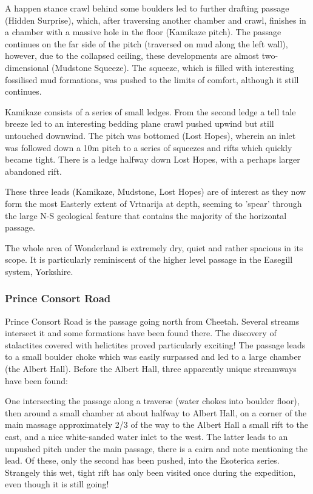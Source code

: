 \documentclass[english,a4]{article}
\begin{document}
A happen stance crawl behind some boulders led to further drafting
passage (Hidden Surprise), which, after traversing another chamber
and crawl, finishes in a chamber with a massive hole in the floor
(Kamikaze pitch). The passage continues on the far side of the pitch
(traversed on mud along the left wall), however, due to the collapsed
ceiling, these developments are almost two-dimensional (Mudstone Squeeze).
The squeeze, which is filled with interesting fossilised mud formations,
was pushed to the limits of comfort, although it still continues.

Kamikaze consists of a series of small ledges. From the second ledge
a tell tale breeze led to an interesting bedding plane crawl pushed
upwind but still untouched downwind. The pitch was bottomed (Lost
Hopes), wherein an inlet was followed down a 10m pitch to a series
of squeezes and rifts which quickly became tight. There is a ledge
halfway down Lost Hopes, with a perhaps larger abandoned rift.

These three leads (Kamikaze, Mudstone, Lost Hopes) are of interest
as they now form the most Easterly extent of Vrtnarija at depth, seeming
to 'spear' through the large N-S geological feature that contains
the majority of the horizontal passage.

The whole area of Wonderland is extremely dry, quiet and rather spacious
in its scope. It is particularly reminiscent of the higher level passage
in the Easegill system, Yorkshire.


\subsubsection{Prince Consort Road}

Prince Consort Road is the passage going north from Cheetah. Several
streams intersect it and some formations have been found there. The
discovery of stalactites covered with helictites proved particularly
exciting! The passage leads to a small boulder choke which was easily
surpassed and led to a large chamber (the Albert Hall). Before the
Albert Hall, three apparently unique streamways have been found:

One intersecting the passage along a traverse (water chokes into boulder
floor), then around a small chamber at about halfway to Albert Hall,
on a corner of the main massage approximately 2/3 of the way to the
Albert Hall a small rift to the east, and a nice white-sanded water
inlet to the west. The latter leads to an unpushed pitch under the
main passage, there is a cairn and note mentioning the lead. Of these,
only the second has been pushed, into the Esoterica series. Strangely
this wet, tight rift has only been visited once during the expedition,
even though it is still going!
\end{document}
